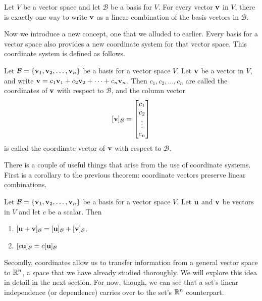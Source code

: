 \documentclass[../m073main.tex]{subfiles}
\begin{document}
\begin{theorem}
	Let $V$ be a vector space and let $\mathcal{B}$ be a basis for $V$.
	For every vector $\mathbf{v}$ in $V$, there is exactly one way to write $\mathbf{v}$ as a linear combination of the basis vectors in $\mathcal{B}$.
\end{theorem}

Now we introduce a new concept, one that we alluded to earlier.
Every basis for a vector space also provides a new coordinate system for that vector space.
This coordinate system is defined as follows.

\begin{definition}
	Let $\mathcal{B} = \{\mathbf{v}_1, \mathbf{v}_2, \ldots, \mathbf{v}_n\}$ be a basis for a vector space $V$.
	Let $\mathbf{v}$ be a vector in $V$, and write $\mathbf{v} = c_1 \mathbf{v}_1 + c_2 \mathbf{v}_2 + \cdots + c_n \mathbf{v}_n$.
	Then $c_1, c_2, \ldots, c_n$ are called the coordinates of $\mathbf{v}$ with respect to $\mathcal{B}$, and the column vector
	\[ [\mathbf{v}]_{\mathcal{B}} = \begin{bmatrix} c_1 \\ c_2 \\ \vdots \\ c_n \end{bmatrix} \]
	is called the coordinate vector of $\mathbf{v}$ with respect to $\mathcal{B}$.
\end{definition}

There is a couple of useful things that arise from the use of coordinate systems.
First is a corollary to the previous theorem: coordinate vectors preserve linear combinations.

\begin{theorem}
	Let $\mathcal{B} = \{\mathbf{v}_1, \mathbf{v}_2, \ldots, \mathbf{v}_n\}$ be a basis for a vector space $V$.
	Let $\mathbf{u}$ and $\mathbf{v}$ be vectors in $V$ and let $c$ be a scalar.
	Then
	\begin{enumerate}[label=(\alph*)]
		\item $[\mathbf{u} + \mathbf{v}]_{\mathcal{B}} = [\mathbf{u}]_{\mathcal{B}} + [\mathbf{v}]_{\mathcal{B}}$.
		\item $[c \mathbf{u}]_{\mathcal{B}} = c[\mathbf{u}]_{\mathcal{B}}$
	\end{enumerate}
\end{theorem}

Secondly, coordinates allow us to transfer information from a general vector space to $\mathbb{R}^n$, a space that we have already studied thoroughly.
We will explore this idea in detail in the next section.
For now, though, we can see that a set's linear independence (or dependence) carries over to the set's $\mathbb{R}^n$ counterpart.
\end{document}

